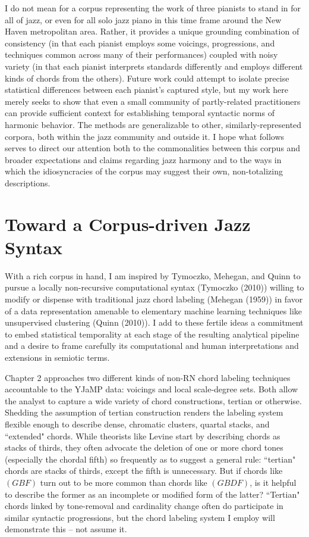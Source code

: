 I do not mean for a corpus representing the work of three pianists to stand in for all of jazz, or even for all solo jazz piano in this time frame around the New Haven metropolitan area.  Rather, it provides a unique grounding combination of consistency (in that each pianist employs some voicings, progressions, and techniques common across many of their performances) coupled with noisy variety (in that each pianist interprets standards differently and employs different kinds of chords from the others).  Future work could attempt to isolate precise statistical differences between each pianist's captured style, but my work here merely seeks to show that even a small community of partly-related practitioners can provide sufficient context for establishing temporal syntactic norms of harmonic behavior.  The methods are generalizable to other, similarly-represented corpora, both within the jazz community and outside it.  I hope what follows serves to direct our attention both to the commonalities between this corpus and broader expectations and claims regarding jazz harmony and to the ways in which the idiosyncracies of the corpus may suggest their own, non-totalizing descriptions.

\section{Toward a Corpus-driven Jazz Syntax}

With a rich corpus in hand, I am inspired by Tymoczko, Mehegan, and Quinn to pursue a locally non-recursive computational syntax (Tymoczko (2010)) willing to modify or dispense with traditional jazz chord labeling (Mehegan (1959)) in favor of a data representation amenable to elementary machine learning techniques like unsupervised clustering (Quinn (2010)).  I add to these fertile ideas a commitment to embed statistical temporality at each stage of the resulting analytical pipeline and a desire to frame carefully its computational and human interpretations and extensions in semiotic terms.

Chapter 2 approaches two different kinds of non-RN chord labeling techniques accountable to the YJaMP data: voicings and local scale-degree sets.  Both allow the analyst to capture a wide variety of chord constructions, tertian or otherwise.  Shedding the assumption of tertian construction renders the labeling system flexible enough to describe dense, chromatic clusters, quartal stacks, and ``extended" chords.  While theorists like Levine start by describing chords as stacks of thirds, they often advocate the deletion of one or more chord tones (especially the chordal fifth) so frequently as to suggest a general rule: ``tertian" chords are stacks of thirds, except the fifth is unnecessary.  But if chords like $(GBF)$ turn out to be more common than chords like $(GBDF)$, is it helpful to describe the former as an incomplete or modified form of the latter?  ``Tertian" chords linked by tone-removal and cardinality change often do participate in similar syntactic progressions, but the chord labeling system I employ will demonstrate this -- not assume it.

